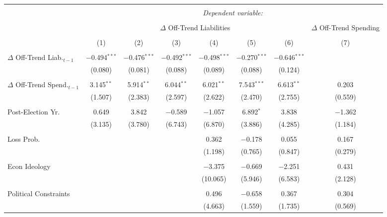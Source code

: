 
\begingroup 
\tiny 
\begin{tabular}{@{\extracolsep{5pt}}lccccccc} 
\\[-1.8ex]\hline 
\hline \\[-1.8ex] 
 & \multicolumn{7}{c}{\textit{Dependent variable:}} \\ 
\cline{2-8} 
\\[-1.8ex] & \multicolumn{6}{c}{$\Delta$ Off-Trend Liabilities} & $\Delta$ Off-Trend Spending \\ 
\\[-1.8ex] & (1) & (2) & (3) & (4) & (5) & (6) & (7)\\ 
\hline \\[-1.8ex] 
 $\Delta$ Off-Trend Liab.$_{t-1}$ & $-$0.494$^{***}$ & $-$0.476$^{***}$ & $-$0.492$^{***}$ & $-$0.498$^{***}$ & $-$0.270$^{***}$ & $-$0.646$^{***}$ &  \\ 
  & (0.080) & (0.081) & (0.088) & (0.089) & (0.088) & (0.124) &  \\ 
  & & & & & & & \\ 
 $\Delta$ Off-Trend Spend.$_{t-1}$ & 3.145$^{**}$ & 5.914$^{**}$ & 6.044$^{**}$ & 6.021$^{**}$ & 7.543$^{***}$ & 6.613$^{**}$ & 0.203 \\ 
  & (1.507) & (2.383) & (2.597) & (2.622) & (2.470) & (2.755) & (0.559) \\ 
  & & & & & & & \\ 
 Post-Election Yr. & 0.649 & 3.842 & $-$0.589 & $-$1.057 & 6.892$^{*}$ & 3.838 & $-$1.362 \\ 
  & (3.135) & (3.780) & (6.743) & (6.870) & (3.886) & (4.285) & (1.184) \\ 
  & & & & & & & \\ 
 Loss Prob. &  &  &  & 0.362 & $-$0.178 & 0.055 & 0.167 \\ 
  &  &  &  & (1.198) & (0.765) & (0.847) & (0.279) \\ 
  & & & & & & & \\ 
 Econ Ideology &  &  &  & $-$3.375 & $-$0.669 & $-$2.251 & 0.431 \\ 
  &  &  &  & (10.065) & (5.946) & (6.583) & (2.128) \\ 
  & & & & & & & \\ 
 Political Constraints &  &  &  & 0.496 & $-$0.658 & 0.367 & 0.304 \\ 
  &  &  &  & (4.663) & (1.559) & (1.735) & (0.569) \\ 

\end{tabular}
